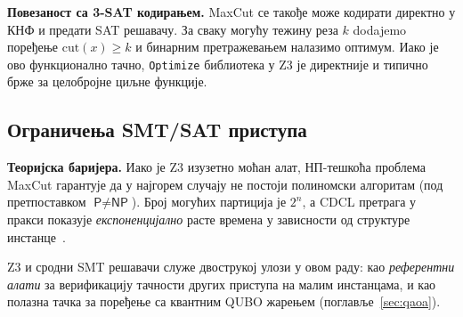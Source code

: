 \textbf{Повезаност са 3-SAT кодирањем.}
MaxCut се такође може кодирати директно у КНФ и предати SAT решавачу.
За сваку могућу тежину реза $k$ dodajemo поређење $\mathrm{cut}(x) \geq k$
и бинарним претражевањем налазимо оптимум.
Иако је ово функционално тачно, \texttt{Optimize} библиотека у Z3 је
директније и типично брже за целобројне циљне функције.

\subsection{Ограничења SMT/SAT приступа}

\textbf{Теоријска баријера.}
Иако је Z3 изузетно моћан алат, НП-тешкоћа проблема MaxCut гарантује
да у најгорем случају не постоји полиномски алгоритам
(под претпоставком $\textsf{P} \neq \textsf{NP}$).
Број могућих партиција је $2^n$, а CDCL претрага у пракси
показује \emph{експоненцијално} расте времена у зависности
од структуре инстанце~\cite{biere2009}.


\begin{remark}
Z3 и сродни SMT решавачи служе двострукој улози у овом раду:
као \emph{референтни алати} за верификацију тачности других
приступа на малим инстанцама, и као полазна тачка за поређење
са квантним QUBO жарењем (поглавље~\ref{sec:qaoa}).
\end{remark}
